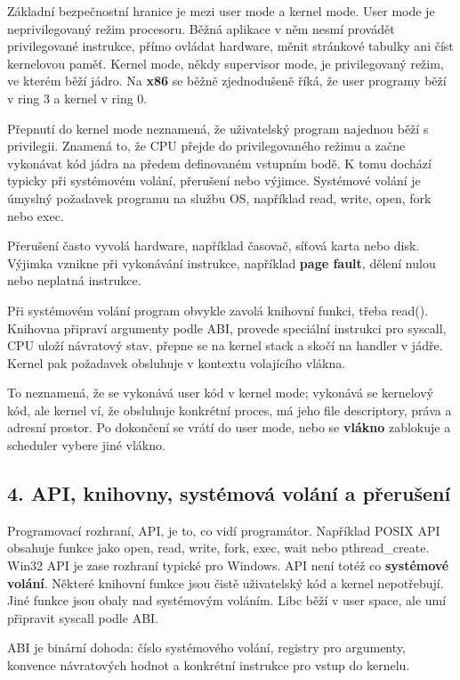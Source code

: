 \documentclass[11pt,a4paper]{article}
\begin{document}
Základní bezpečnostní hranice je mezi user mode a kernel mode. User mode je neprivilegovaný režim procesoru. Běžná aplikace v něm nesmí provádět privilegované instrukce, přímo ovládat hardware, měnit stránkové tabulky ani číst kernelovou paměť. Kernel mode, někdy supervisor mode, je privilegovaný režim, ve kterém běží jádro. Na \textbf{x86} se běžně zjednodušeně říká, že user programy běží v ring 3 a kernel v ring 0.

Přepnutí do kernel mode neznamená, že uživatelský program najednou běží s privilegii. Znamená to, že CPU přejde do privilegovaného režimu a začne vykonávat kód jádra na předem definovaném vstupním bodě. K tomu dochází typicky při systémovém volání, přerušení nebo výjimce. Systémové volání je úmyslný požadavek programu na službu OS, například read, write, open, fork nebo exec.

Přerušení často vyvolá hardware, například časovač, síťová karta nebo disk. Výjimka vznikne při vykonávání instrukce, například \textbf{page fault}, dělení nulou nebo neplatná instrukce.

Při systémovém volání program obvykle zavolá knihovní funkci, třeba read(). Knihovna připraví argumenty podle ABI, provede speciální instrukci pro syscall, CPU uloží návratový stav, přepne se na kernel stack a skočí na handler v jádře. Kernel pak požadavek obsluhuje v kontextu volajícího vlákna.

To neznamená, že se vykonává user kód v kernel mode; vykonává se kernelový kód, ale kernel ví, že obsluhuje konkrétní proces, má jeho file descriptory, práva a adresní prostor. Po dokončení se vrátí do user mode, nebo se \textbf{vlákno} zablokuje a scheduler vybere jiné vlákno.

\subsection*{4. API, knihovny, systémová volání a přerušení}

Programovací rozhraní, API, je to, co vidí programátor. Například POSIX API obsahuje funkce jako open, read, write, fork, exec, wait nebo pthread\_create. Win32 API je zase rozhraní typické pro Windows. API není totéž co \textbf{systémové volání}. Některé knihovní funkce jsou čistě uživatelský kód a kernel nepotřebují. Jiné funkce jsou obaly nad systémovým voláním. Libc běží v user space, ale umí připravit syscall podle ABI.

ABI je binární dohoda: číslo systémového volání, registry pro argumenty, konvence návratových hodnot a konkrétní instrukce pro vstup do kernelu.
\end{document}
